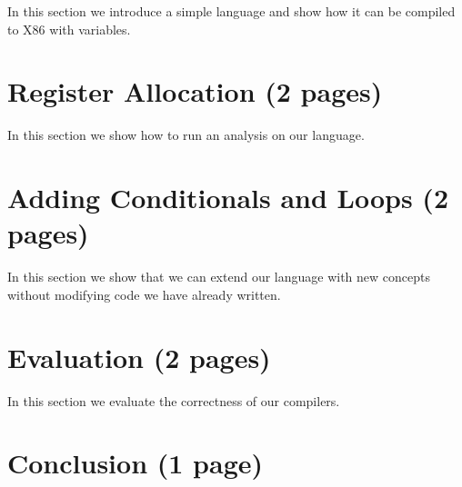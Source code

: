 \documentclass[sigplan,anonymous,review]{acmart}
\begin{document}
In this section we introduce a simple language and show how it can be compiled to X86 with variables.

\section{Register Allocation (2 pages)} \label{sec:analysis}

In this section we show how to run an analysis on our language.

\section{Adding Conditionals and Loops (2 pages)} \label{sec:cond-loops}

In this section we show that we can extend our language with new concepts without modifying code we have already written.

\section{Evaluation (2 pages)} \label{sec:evaluation}

In this section we evaluate the correctness of our compilers.

\section{Conclusion (1 page)} \label{sec:conclusion}
\end{document}
